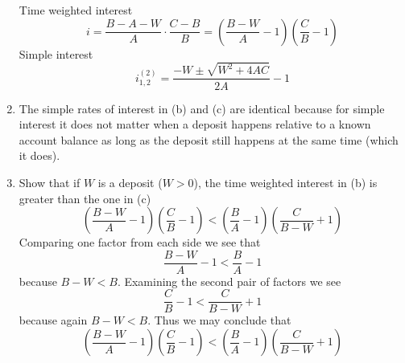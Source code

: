 \documentclass[a4paper, 12pt, reqno]{amsart}
\numberwithin{equation}{section}
\begin{document}
\begin{enumerate}[label=(\alph*)]
\begin{center}
        \end{center}
        Time weighted interest
        \begin{equation}\nonumber
            i = \frac{B-A-W}{A} \cdot \frac{C-B}{B} 
                = \left(\frac{B-W}{A} -1 \right)\left(\frac{C}{B} -1  \right)
        \end{equation}
        Simple interest
        \begin{equation}\nonumber
            i_{1,2}^{(2)} = \frac{-W \pm \sqrt{W^2+4AC}}{2A} -1
        \end{equation}
    \item The simple rates of interest in (b) and (c) are identical because for
        simple interest it does not matter when a deposit happens relative to
        a known account balance as long as the deposit still happens at the
        same time (which it does).
    \item Show that if $W$ is a deposit ($W>0$), the time weighted interest in
        (b) is greater than the one in (c)
        \begin{equation}\nonumber
            \left(\frac{B-W}{A} -1 \right)\left(\frac{C}{B} -1  \right)
            < \left(\frac{B}{A}-1\right)\left(\frac{C}{B-W}+1\right)
        \end{equation}
        Comparing one factor from each side we see that
        \begin{equation}\nonumber
            \frac{B-W}{A} -1 < \frac{B}{A}-1
        \end{equation}
        because $B-W < B$. Examining the second pair of factors we see
        \begin{equation}\nonumber
            \frac{C}{B} -1 < \frac{C}{B-W}+1
        \end{equation}
        because again $B-W < B$. Thus we may conclude that
        \begin{equation}\nonumber
            \left(\frac{B-W}{A} -1 \right)\left(\frac{C}{B} -1  \right)
            < \left(\frac{B}{A}-1\right)\left(\frac{C}{B-W}+1\right)
        \end{equation}
\end{enumerate}
\end{document}
